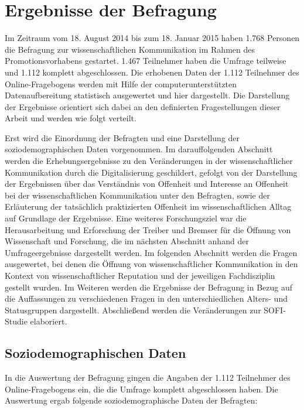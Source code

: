 \section{Ergebnisse der Befragung}

Im Zeitraum vom 18. August 2014 bis zum 18. Januar 2015 haben 1.768 Personen die Befragung zur wissenschaftlichen Kommunikation im Rahmen des Promotionsvorhabens gestartet. 1.467 Teilnehmer haben die Umfrage teilweise und 1.112 komplett abgeschlossen. Die erhobenen Daten der 1.112 Teilnehmer des Online-Fragebogens werden mit Hilfe der computerunterstützten Datenaufbereitung statistisch ausgewertet und hier dargestellt. Die Darstellung der Ergebnisse orientiert sich dabei an den definierten Fragestellungen dieser Arbeit und werden wie folgt verteilt.

Erst wird die Einordnung der Befragten und eine Darstellung der soziodemographischen Daten vorgenommen. Im darauffolgenden Abschnitt werden die Erhebungsergebnisse zu den Veränderungen in der wissenschaftlicher Kommunikation durch die Digitalisierung geschildert, gefolgt von der Darstellung der Ergebnissen über das Verständnis von Offenheit und Interesse an Offenheit bei der wissenschaftlichen Kommunikation unter den Befragten, sowie der Erläuterung der tatsächlich praktizierten Offenheit im wissenschaftlichen Alltag auf Grundlage der Ergebnisse. Eine weiteres Forschungsziel war die Herausarbeitung und Erforschung der Treiber und Bremser für die Öffnung von Wissenschaft und Forschung, die im nächsten Abschnitt anhand der Umfrageergebnisse dargestellt werden. Im folgenden Abschnitt werden die Fragen ausgewertet, bei denen die Öffnung von wissenschaftlicher Kommunikation in den Kontext von wissenschaftlicher Reputation und der jeweiligen Fachdisziplin gestellt wurden. Im Weiteren werden die Ergebnisse der Befragung in Bezug auf die Auffassungen zu verschiedenen Fragen in den unterschiedlichen Alters- und Statusgruppen dargestellt. Abschließend werden die Veränderungen zur SOFI-Studie elaboriert.

\subsection{Soziodemographischen Daten}

In die Auswertung der Befragung gingen die Angaben der 1.112 Teilnehmer des Online-Fragebogens ein, die die Umfrage komplett abgeschlossen haben. Die Auswertung ergab folgende soziodemographische Daten der Befragten:

